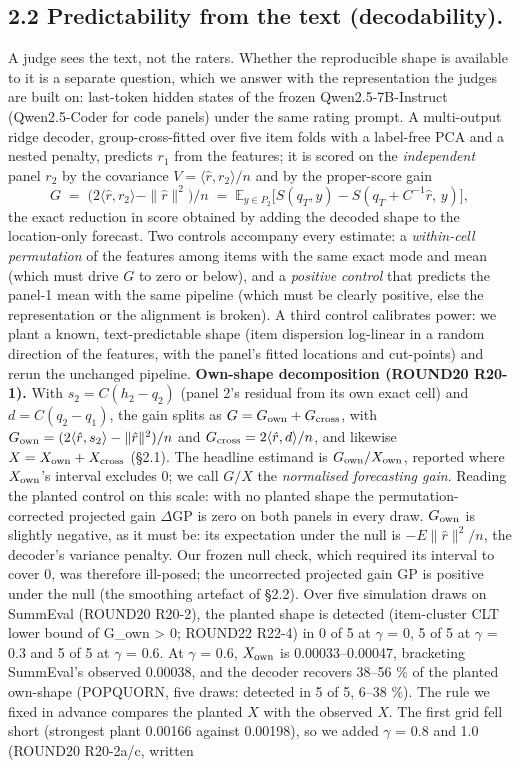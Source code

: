 \documentclass[10pt]{article}
\begin{document}
\subsection*{2.2 Predictability from the text (decodability).} A judge sees the text, not the raters. Whether the reproducible shape is available to it is a separate question, which we answer with the representation the judges are built on: last-token hidden states of the frozen Qwen2.5-7B-Instruct (Qwen2.5-Coder for code panels) under the same rating prompt. A multi-output ridge decoder, group-cross-fitted over five item folds with a label-free PCA and a nested penalty, predicts \(r_1\) from the features; it is scored on the \emph{independent} panel \(r_2\) by the covariance \(V=\langle\hat r,r_2\rangle/n\) and by the proper-score gain \[G \;=\; \big(2\langle \hat r, r_2\rangle - \|\hat r\|^2\big)/n \;=\; \mathbb E_{y\in P_2}\big[S(q_T,y) - S(q_T + C^{-1}\hat r,\,y)\big],\] the exact reduction in score obtained by adding the decoded shape to the location-only forecast. Two controls accompany every estimate: a \emph{within-cell permutation} of the features among items with the same exact mode and mean (which must drive \(G\) to zero or below), and a \emph{positive control} that predicts the panel-1 mean with the same pipeline (which must be clearly positive, else the representation or the alignment is broken). A third control calibrates power: we plant a known, text-predictable shape (item dispersion log-linear in a random direction of the features, with the panel's fitted locations and cut-points) and rerun the unchanged pipeline. \textbf{Own-shape decomposition (ROUND20 R20-1).} With \(s_2=C(h_2-q_2)\) (panel 2's residual from its own exact cell) and \(d=C(q_2-q_1)\), the gain splits as \(G=G_{\rm own}+G_{\rm cross}\), with \(G_{\rm own}=(2\langle\hat r,s_2\rangle-\|\hat r\|^2)/n\) and \(G_{\rm cross}=2\langle\hat r,d\rangle/n\), and likewise \(X=X_{\rm own}+X_{\rm cross}\) (\S{}2.1). The headline estimand is \(G_{\rm own}/X_{\rm own}\), reported where \(X_{\rm own}\)'s interval excludes 0; we call \(G/X\) the \emph{normalised forecasting gain}. Reading the planted control on this scale: with no planted shape the permutation-corrected projected gain $\Delta$GP is zero on both panels in every draw. \(G_{\rm own}\) is slightly negative, as it must be: its expectation under the null is \(-E\|\hat r\|^2/n\), the decoder's variance penalty. Our frozen null check, which required its interval to cover 0, was therefore ill-posed; the uncorrected projected gain GP is positive under the null (the smoothing artefact of \S{}2.2). Over five simulation draws on SummEval (ROUND20 R20-2), the planted shape is detected (item-cluster CLT lower bound of G\_own \textgreater{} 0; ROUND22 R22-4) in 0 of 5 at $\gamma$ = 0, 5 of 5 at $\gamma$ = 0.3 and 5 of 5 at $\gamma$ = 0.6. At $\gamma$ = 0.6, \(X_{\rm own}\) is 0.00033--0.00047, bracketing SummEval's observed 0.00038, and the decoder recovers 38--56 \% of the planted own-shape (POPQUORN, five draws: detected in 5 of 5, 6--38 \%). The rule we fixed in advance compares the planted \(X\) with the observed \(X\). The first grid fell short (strongest plant 0.00166 against 0.00198), so we added $\gamma$ = 0.8 and 1.0 (ROUND20 R20-2a/c, written 
\end{document}
